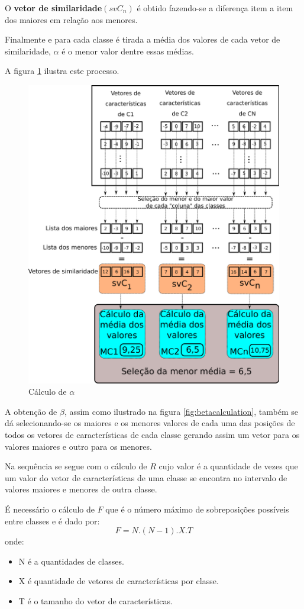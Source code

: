 \documentclass[a4paper,12pt,openright,oneside]{book}
\newenvironment{myenv}[1]
  {\begin{spacing}{#1}}
  {\end{spacing}}
\begin{document}
\begin{myenv}{1.5}
						\par O \textbf{vetor de similaridade}$(svC_n)$ é obtido fazendo-se a diferença item a item dos maiores em relação aos menores.
						
						\par Finalmente e para cada classe é tirada a média dos valores de cada vetor de similaridade, $\alpha$ é o menor valor dentre essas médias.
						
						\par A figura \ref{fig:calculoalpha} ilustra este processo.
						
						\begin{figure}[h]
							\centering
							\includegraphics[width=0.6\linewidth]{images/calculoAlpha.pdf}
							\caption{Cálculo de $\alpha$}
							\label{fig:calculoalpha}
						\end{figure}
						
						\par A obtenção de $\beta$, assim como ilustrado na figura \ref{fig:betacalculation}, também se dá selecionando-se os maiores e os menores valores de cada uma das posições de todos os vetores de características de cada classe gerando assim um vetor para os valores maiores e outro para os menores.
						
						\par Na sequência se segue com o cálculo de $R$ cujo valor é a quantidade de vezes que um valor do vetor de características de uma classe se encontra no intervalo de valores maiores e menores de outra classe.
						
						\par É necessário o cálculo de $F$ que é o número máximo de sobreposições possíveis entre classes e é dado por:
						\begin{equation}
								F=N.(N-1).X.T
						\end{equation}
						onde:
						\begin{itemize}
							\item N é a quantidades de classes.
							\item X é quantidade de vetores de características por classe.
							\item T é o tamanho do vetor de características.
						\end{itemize}


\end{myenv}
\end{document}
